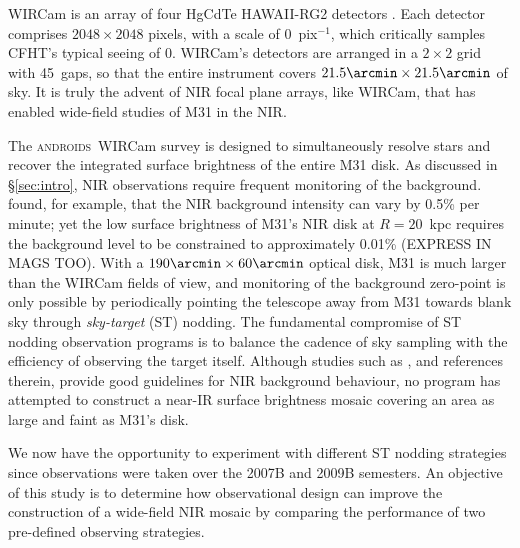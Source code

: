 \documentclass[iop]{emulateapj}
\newcommand{\androids}{\textsc{androids}}
\newcommand{\todo}[1]{\textcolor{BurntOrange}{\textsf{#1}}} %
\newcommand{\Sec}[1]{\S\ref{sec:#1}}  %
\begin{document}
WIRCam is an array of four HgCdTe HAWAII-RG2 detectors \citep{Puget:2004}.
Each detector comprises $2048\times 2048$ pixels, with a scale of 0~pix$^{-1}$, which critically samples CFHT's typical seeing of 0.
WIRCam's detectors are arranged in a $2\times 2$ grid with 45\arcsec~gaps, so that the entire instrument covers $21.5\arcmin \times 21.5\arcmin$ of sky.
It is truly the advent of NIR focal plane arrays, like WIRCam, that has enabled wide-field studies of M31 in the NIR.

The \androids\ WIRCam survey is designed to simultaneously resolve stars and recover the integrated surface brightness of the entire M31 disk.
As discussed in \Sec{intro}, NIR observations require frequent monitoring of the background.
\cite{Vaduvescu:2004} found, for example, that the NIR background intensity can vary by 0.5\% per minute; yet the low surface brightness of M31's NIR disk at $R=20$~kpc requires the background level to be constrained to approximately 0.01\% \todo{(EXPRESS IN MAGS TOO)}.
With a $190\arcmin \times 60\arcmin$ optical disk, M31 is much larger than the WIRCam fields of view, and monitoring of the background zero-point is only possible by periodically pointing the telescope away from M31 towards blank sky through \emph{sky-target} (ST) nodding. 
The fundamental compromise of ST nodding observation programs is to balance the cadence of sky sampling with the efficiency of observing the target itself.
Although studies such as \cite{Vaduvescu:2004}, and references therein, provide good guidelines for NIR background behaviour, no program has attempted to construct a near-IR surface brightness mosaic covering an area as large and faint as M31's disk.

We now have the opportunity to experiment with different ST nodding strategies since observations were taken over the 2007B and 2009B semesters.
An objective of this study is to determine how observational design can improve the construction of a wide-field NIR mosaic by comparing the performance of two pre-defined observing strategies.
\end{document}
